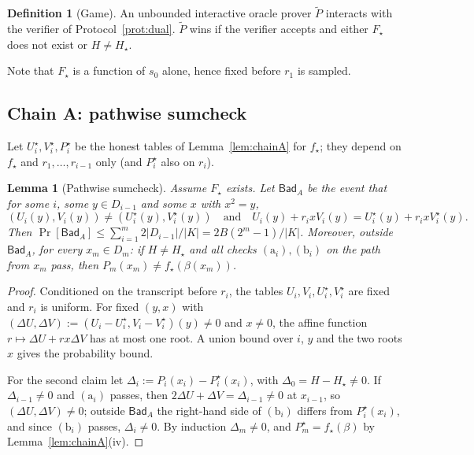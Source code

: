 \documentclass[11pt]{article}
\newtheorem{lemma}[theorem]{Lemma}
\theoremstyle{definition}
\newtheorem{definition}[theorem]{Definition}
\newcommand{\K}{K}
\newcommand{\Bad}{\mathsf{Bad}}
\begin{document}
\begin{definition}[Game]
An unbounded interactive oracle prover $\widetilde P$ interacts with the verifier of Protocol~\ref{prot:dual}. $\widetilde P$ wins if the verifier accepts and either $F_\star$ does not exist or $H\neq H_\star$.
\end{definition}

Note that $F_\star$ is a function of $s_0$ alone, hence fixed before $r_1$ is sampled.

\subsection{Chain A: pathwise sumcheck}

Let $U_i^\star,V_i^\star,P_i^\star$ be the honest tables of Lemma~\ref{lem:chainA} for $f_\star$; they depend on $f_\star$ and $r_1,\dots,r_{i-1}$ only (and $P_i^\star$ also on $r_i$).

\begin{lemma}[Pathwise sumcheck]\label{lem:pathA}
Assume $F_\star$ exists. Let $\Bad_A$ be the event that for some $i$, some $y\in D_{i-1}$ and some $x$ with $x^2=y$,
\[
(U_i(y),V_i(y))\neq(U_i^\star(y),V_i^\star(y))\quad\text{and}\quad U_i(y)+r_ixV_i(y)=U_i^\star(y)+r_ixV_i^\star(y).
\]
Then $\Pr[\Bad_A]\le\sum_{i=1}^m2|D_{i-1}|/|\K|=2B(2^m-1)/|\K|$. Moreover, outside $\Bad_A$, for \emph{every} $x_m\in D_m$: if $H\ne H_\star$ and all checks $(\mathrm a_i),(\mathrm b_i)$ on the path from $x_m$ pass, then $P_m(x_m)\neq f_\star(\beta(x_m))$.
\end{lemma}
\begin{proof}
Conditioned on the transcript before $r_i$, the tables $U_i,V_i,U_i^\star,V_i^\star$ are fixed and $r_i$ is uniform. For fixed $(y,x)$ with $(\Delta U,\Delta V):=(U_i-U_i^\star,V_i-V_i^\star)(y)\ne0$ and $x\ne0$, the affine function $r\mapsto\Delta U+rx\Delta V$ has at most one root. A union bound over $i$, $y$ and the two roots $x$ gives the probability bound.

For the second claim let $\Delta_i:=P_i(x_i)-P_i^\star(x_i)$, with $\Delta_0=H-H_\star\ne0$. If $\Delta_{i-1}\neq0$ and $(\mathrm a_i)$ passes, then $2\Delta U+\Delta V=\Delta_{i-1}\ne0$ at $x_{i-1}$, so $(\Delta U,\Delta V)\ne0$; outside $\Bad_A$ the right-hand side of $(\mathrm b_i)$ differs from $P_i^\star(x_i)$, and since $(\mathrm b_i)$ passes, $\Delta_i\ne0$. By induction $\Delta_m\ne0$, and $P_m^\star=f_\star(\beta)$ by Lemma~\ref{lem:chainA}(iv).
\end{proof}
\end{document}
